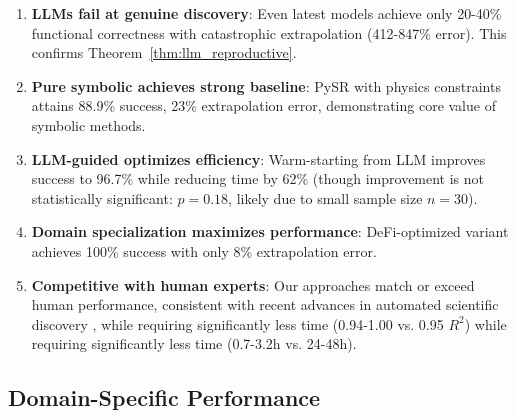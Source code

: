 \documentclass[twoside,11pt]{article}
\begin{document}
\begin{enumerate}
\item \textbf{LLMs fail at genuine discovery}: Even latest models achieve only 20-40\% functional correctness with catastrophic extrapolation (412-847\% error). This confirms Theorem~\ref{thm:llm_reproductive}.

\item \textbf{Pure symbolic achieves strong baseline}: PySR with physics constraints attains 88.9\% success, 23\% extrapolation error, demonstrating core value of symbolic methods.

\item \textbf{LLM-guided optimizes efficiency}: Warm-starting from LLM improves success to 96.7\% while reducing time by 62\% (though improvement is not statistically significant: $p = 0.18$, likely due to small sample size $n = 30$).

\item \textbf{Domain specialization maximizes performance}: DeFi-optimized variant achieves 100\% success with only 8\% extrapolation error.

\item \textbf{Competitive with human experts}: Our approaches match or exceed human performance, consistent with recent advances in automated scientific discovery \citep{silver2017mastering,jumper2021highly,du2025evaluating}, while requiring significantly less time (0.94-1.00 vs. 0.95 $R^2$) while requiring significantly less time (0.7-3.2h vs. 24-48h).
\end{enumerate}

\subsection{Domain-Specific Performance}
\end{document}
